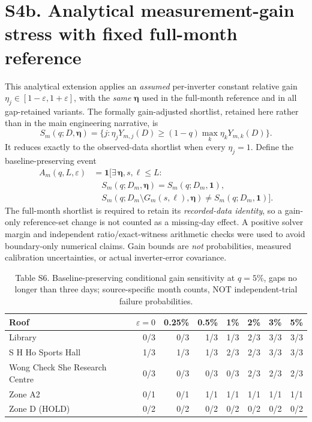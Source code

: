 \documentclass[11pt]{article}
\begin{document}
\section*{S4b. Analytical measurement-gain stress with fixed full-month reference}
This analytical extension applies an \emph{assumed} per-inverter constant relative gain $\eta_j\in[1-\varepsilon,1+\varepsilon]$, with the \emph{same} $\boldsymbol{\eta}$ used in the full-month reference and in all gap-retained variants. The formally gain-adjusted shortlist, retained here rather than in the main engineering narrative, is
\[
S_m(q;D,\boldsymbol{\eta})=\{j:\eta_jY_{m,j}(D)\ge(1-q)\max_k\eta_kY_{m,k}(D)\}.
\]
It reduces exactly to the observed-data shortlist when every $\eta_j=1$. Define the baseline-preserving event
\[
\begin{aligned}
A_m(q,L,\varepsilon)&=\mathbf{1}\!\big[
\exists\,\boldsymbol{\eta},s,\ell\leq L:
\\[-0.15em]
&\quad S_m(q;D_m,\boldsymbol{\eta})
=S_m(q;D_m,\mathbf{1}),\\[-0.1em]
&\quad S_m(q;D_m\setminus G_m(s,\ell),\boldsymbol{\eta})
\ne S_m(q;D_m,\mathbf{1})\big].
\end{aligned}
\]
The full-month shortlist is required to retain its \emph{recorded-data identity}, so a gain-only reference-set change is not counted as a missing-day effect. A positive solver margin and independent ratio/exact-witness arithmetic checks were used to avoid boundary-only numerical claims. Gain bounds are \emph{not} probabilities, measured calibration uncertainties, or actual inverter-error covariance.

\begin{table}[h]
\centering
\caption*{Table S6. Baseline-preserving conditional gain sensitivity at $q=5\%$, gaps no longer than three days; source-specific month counts, NOT independent-trial failure probabilities.}
\small
\begin{tabular}{p{3.8cm}rrrrrrr}
\toprule
Roof & $\varepsilon=0$ & 0.25\% & 0.5\% & 1\% & 2\% & 3\% & 5\% \\
\midrule
Library & 0/3 & 0/3 & 1/3 & 1/3 & 2/3 & 3/3 & 3/3 \\
S H Ho Sports Hall & 1/3 & 1/3 & 1/3 & 2/3 & 2/3 & 3/3 & 3/3 \\
Wong Check She Research Centre & 0/3 & 0/3 & 0/3 & 0/3 & 2/3 & 2/3 & 2/3 \\
Zone A2 & 0/1 & 0/1 & 1/1 & 1/1 & 1/1 & 1/1 & 1/1 \\
Zone D (HOLD) & 0/2 & 0/2 & 0/2 & 0/2 & 0/2 & 0/2 & 0/2 \\
\bottomrule
\end{tabular}
\end{table}
\end{document}
